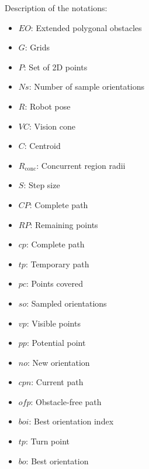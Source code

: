     Description of the notations:
    \begin{itemize}[noitemsep,topsep=0pt]
        \item $EO$: Extended polygonal obstacles
        \item $G$: Grids
        \item $P$: Set of 2D points
        \item $Ns$: Number of sample orientations
        \item $R$: Robot pose
        \item $VC$: Vision cone
        \item $C$: Centroid
        \item $R_{\text{conc}}$: Concurrent region radii
        \item $S$: Step size
        \item $CP$: Complete path
        \item $RP$: Remaining points
        \item $cp$: Complete path
        \item $tp$: Temporary path
        \item $pc$: Points covered
        \item $so$: Sampled orientations
        \item $vp$: Visible points
        \item $pp$: Potential point
        \item $no$: New orientation
        \item $cpn$: Current path
        \item $ofp$: Obstacle-free path
        \item $boi$: Best orientation index
        \item $tp$: Turn point
        \item $bo$: Best orientation
    \end{itemize}
    









